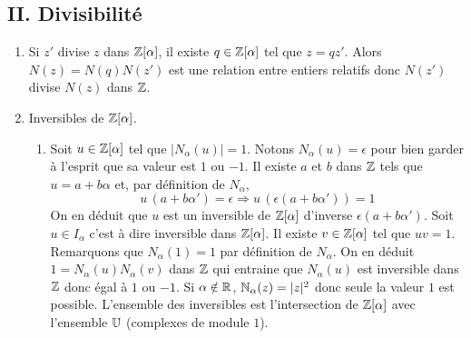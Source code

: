 \subsection*{II. Divisibilité}
\begin{enumerate}
  \item Si $z'$ divise $z$ dans $\mathbb{Z}[\alpha]$, il existe $q\in \mathbb{Z}[\alpha]$ tel que $z=qz'$. Alors $N(z) = N(q) N(z')$ est une relation entre entiers relatifs donc $N(z')$ divise $N(z)$ dans $\mathbb{Z}$.
  
  \item Inversibles de $\mathbb{Z}[\alpha]$.
    \begin{enumerate}
    \item Soit $u\in \mathbb{Z}[\alpha]$ tel que $|N_{\alpha}(u)|=1$.\newline
  Notons $N_{\alpha}(u)=\epsilon$ pour bien garder à l'esprit que sa valeur est $1$ ou $-1$. Il existe $a$ et $b$ dans $\mathbb{Z}$ tels que $u=a+b\alpha$ et, par définition de $N_{\alpha}$,
  \begin{displaymath}
    u\,(a+b\alpha') = \epsilon \Rightarrow u\,\left( \epsilon (a+b\alpha')\right)=1 
  \end{displaymath}
On en déduit que $u$ est un inversible de $\mathbb{Z}[\alpha]$ d'inverse $\epsilon (a+b\alpha')$.\newline
Soit $u\in I_{\alpha}$ c'est à dire inversible dans $\mathbb{Z}[\alpha]$.\newline
Il existe $v\in \mathbb{Z}[\alpha]$ tel que $uv=1$. Remarquons que $N_\alpha(1)=1$ par définition de $N_\alpha$. On en déduit $1=N_{\alpha}(u)N_{\alpha}(v)$ dans $\mathbb{Z}$ qui entraine que $N_{\alpha}(u)$ est inversible dans $\mathbb{Z}$ donc égal à $1$ ou $-1$.\newline
Si $\alpha\notin \mathbb{R}$, $\mathbb{N}_{\alpha}(z) = |z|^2$ donc seule la valeur $1$ est possible. L'ensemble des inversibles est l'intersection de $\mathbb{Z}[\alpha]$ avec l'ensemble $\mathbb{U}$ (complexes de module $1$).


\end{enumerate}
\end{enumerate}

